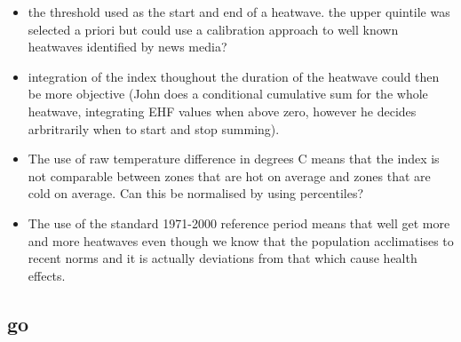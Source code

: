 \documentclass[a4paper]{article}
\begin{document}
 \begin{itemize}
 \item the threshold used as the start and end of a heatwave.  the upper quintile was selected a priori but could use a calibration approach to well known heatwaves identified by news media?
 \item integration of the index thoughout the duration of the heatwave could then be more objective (John does a conditional cumulative sum for the whole heatwave, integrating EHF values when above zero, however he decides arbritrarily when to start and stop summing).
 \item The use of raw temperature difference in degrees C means that the index is not comparable between zones that are hot on average and zones that are cold on average.  Can this be normalised by using percentiles?
 \item The use of the standard 1971-2000 reference period means that well get more and more heatwaves even though we know that the population acclimatises to recent norms and it is actually deviations from that which cause health effects.
 \end{itemize}
 
 

\subsection{go}


\end{document}
